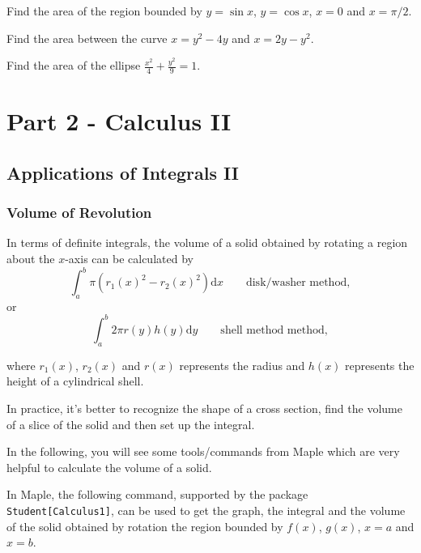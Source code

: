 \documentclass[]{book}
\theoremstyle{definition}
\theoremstyle{definition}
\theoremstyle{definition}
\theoremstyle{remark}
\let\BeginKnitrBlock\begin \let\EndKnitrBlock\end
\begin{document}
\BeginKnitrBlock{exercise}
\protect\hypertarget{exr:unnamed-chunk-156}{}{\label{exr:unnamed-chunk-156} }
Find the area of the region bounded by \(y=\sin x\), \(y=\cos x\), \(x=0\) and \(x=\pi/2\).
\EndKnitrBlock{exercise}

\BeginKnitrBlock{exercise}
\protect\hypertarget{exr:unnamed-chunk-157}{}{\label{exr:unnamed-chunk-157} }
Find the area between the curve \(x=y^2-4y\) and \(x=2y-y^2\).
\EndKnitrBlock{exercise}

\BeginKnitrBlock{exercise}
\protect\hypertarget{exr:unnamed-chunk-158}{}{\label{exr:unnamed-chunk-158} }
Find the area of the ellipse \(\frac{x^2}{4}+\frac{y^2}{9}=1\).
\EndKnitrBlock{exercise}

\hypertarget{part-part-2---calculus-ii}{%
\part*{Part 2 - Calculus II}\label{part-part-2---calculus-ii}}

\hypertarget{applications-of-integrals-ii}{%
\chapter{Applications of Integrals II}\label{applications-of-integrals-ii}}

\hypertarget{volume-of-revolution}{%
\section{Volume of Revolution}\label{volume-of-revolution}}

In terms of definite integrals, the volume of a solid obtained by rotating a region about the \(x\)-axis can be calculated by
\[\int_a^b \pi (r_1(x)^2 - r_2(x)^2) \mathrm{d} x \qquad \text{disk/washer method},\]
or
\[\int_a^b 2\pi r(y) h(y) \mathrm{d} y \qquad \text{shell method method},\]

where \(r_1(x)\), \(r_2(x)\) and \(r(x)\) represents the radius and \(h(x)\) represents the height of a cylindrical shell.

In practice, it's better to recognize the shape of a cross section, find the volume of a slice of the solid and then set up the integral.

In the following, you will see some tools/commands from Maple which are very helpful to calculate the volume of a solid.

In Maple, the following command, supported by the package \texttt{Student{[}Calculus1{]}}, can be used to get the graph, the integral and the volume of the solid obtained by rotation the region bounded by \(f(x)\), \(g(x)\), \(x=a\) and \(x=b\).
\end{document}
